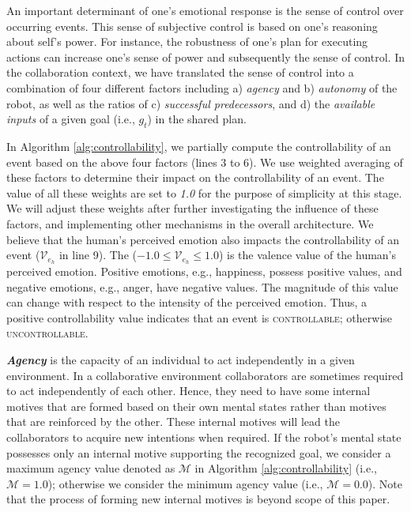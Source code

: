 \documentclass{article}
\begin{document}
An important determinant of one's emotional response is the sense of control
over occurring events. This sense of subjective control is based on one's
reasoning about self's power. For instance, the robustness of one's plan for
executing actions can increase one's sense of power and subsequently the sense
of control. In the collaboration context, we have translated the sense of control
into a combination of four different factors including a) \textit{agency} and b)
\textit{autonomy} of the robot, as well as the ratios of c) \textit{successful
predecessors}, and d) the \textit{available inputs} of a given goal
(i.e., $\mathit{g}_{t}$) in the shared plan.

In Algorithm \ref{alg:controllability}, we partially compute the controllability
of an event based on the above four factors (lines 3 to 6). We use weighted
averaging of these factors to determine their impact on the controllability of
an event. The value of all these weights are set to \textit{1.0} for the purpose
of simplicity at this stage. We will adjust these weights after further
investigating the influence of these factors, and implementing other mechanisms
in the overall architecture. We believe that the human's perceived emotion also
impacts the controllability of an event ($\mathcal{V}_{e_h}$ in line 9). The
($-1.0 \leq \mathcal{V}_{e_h} \leq 1.0$) is the valence value of the human's
perceived emotion. Positive emotions, e.g., happiness, possess positive values,
and negative emotions, e.g., anger, have negative values. The magnitude of this
value can change with respect to the intensity of the perceived emotion. Thus, a
positive controllability value indicates that an event is \textsc{controllable};
otherwise \textsc{uncontrollable}.

\textit{\textbf{Agency}} is the capacity of an individual to act independently
in a given environment. In a collaborative environment collaborators are
sometimes required to act independently of each other. Hence, they need to have
some internal motives that are formed based on their own mental states rather
than motives that are reinforced by the other. These internal motives will lead
the collaborators to acquire new intentions when required. If the robot's mental
state possesses only an internal motive supporting the recognized goal, we
consider a maximum agency value denoted as $\mathcal{M}$ in Algorithm
\ref{alg:controllability} (i.e., $\mathcal{M}=1.0$); otherwise we consider the
minimum agency value (i.e., $\mathcal{M}=0.0$). Note that the process of forming
new internal motives is beyond scope of this paper.
\end{document}
